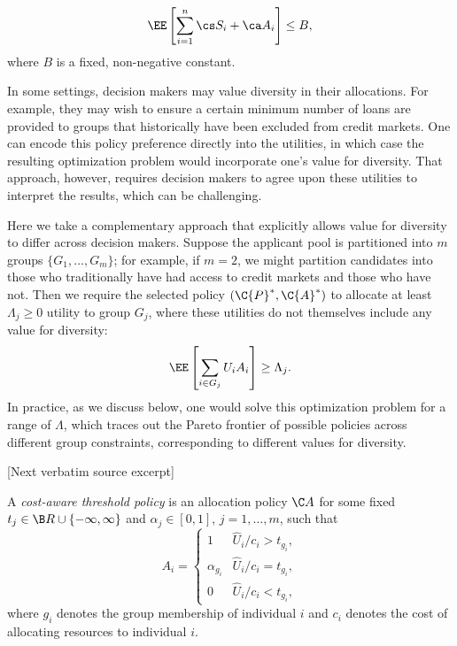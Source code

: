\documentclass[10pt]{article}
\begin{document}
\begin{ReviewVerbatim}
\begin{equation}
\label{eq:def2}
    \EE \left[ \sum_{i = 1}^n \cs S_i + \ca  A_i \right] \leq B,
\end{equation}
where \(B\) is a fixed, non-negative constant.

In some settings, decision makers may value diversity in their allocations.
For example, they may wish to ensure a certain minimum number of loans are provided to groups that historically have been excluded from credit markets.
One can encode this policy preference directly into the utilities, in which case the resulting optimization problem would incorporate one's value for diversity.
That approach, however, requires decision makers to agree upon these utilities to interpret the results, which can be challenging.

Here we take a complementary approach that explicitly allows value for diversity to differ across decision makers.
Suppose the applicant pool is partitioned into \(m\) groups \(\{G_1, \ldots, G_m\}\);
for example, if \(m = 2\), we might partition candidates into those who traditionally have had access to credit markets and those who have not.
Then we require the selected policy \((\C{P}^*, \C{A}^*)\)
to allocate at least \(\Lambda_j \geq 0\) utility to group \(G_j\), where these utilities do not themselves include any value for diversity:
    \begin{equation}
    \label{eq:def3}
        \EE \left[ \sum_{i \in G_j} U_i A_i \right] \geq \Lambda_j.
    \end{equation}
In practice, as we discuss below, one would solve this optimization problem for a range of \(\Lambda\), which traces out the Pareto frontier of possible policies across different group constraints, corresponding to different values for diversity.

[Next verbatim source excerpt]

\begin{defn}
    A \emph{cost-aware threshold policy} is an allocation policy \(\C A\) for some fixed \(t_j \in \B R \cup \{-\infty, \infty\}\) and \(\alpha_j \in [0,1]\), \(j = 1, \ldots, m\), such that
        \begin{equation*}
            A_i = \begin{cases}
                1 & \hat U_i / c_i > t_{g_i},\\
                \alpha_{g_i} & \hat U_i / c_i = t_{g_i}, \\
                0 & \hat U_i / c_i < t_{g_i},
            \end{cases}
        \end{equation*}
    where \(g_i\) denotes the group membership of individual \(i\) and \(c_i\) denotes the cost of allocating resources to individual \(i\).
\end{defn}


\end{ReviewVerbatim}
\end{document}

